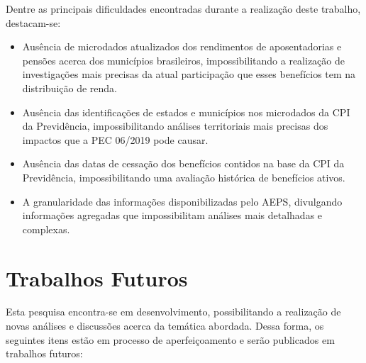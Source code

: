 Dentre as principais dificuldades encontradas durante a realização deste trabalho, destacam-se:

\begin{itemize}
    \item Ausência de microdados atualizados dos rendimentos de aposentadorias e pensões acerca dos municípios brasileiros, impossibilitando a realização de investigações mais precisas da atual participação que esses benefícios tem na distribuição de renda.
    
    \item Ausência das identificações de estados e municípios nos microdados da CPI da Previdência, impossibilitando análises territoriais mais precisas dos impactos que a PEC 06/2019 pode causar.
    
    \item Ausência das datas de cessação dos benefícios contidos na base da CPI da Previdência, impossibilitando uma avaliação histórica de benefícios ativos.
    
    \item A granularidade das informações disponibilizadas pelo AEPS, divulgando informações agregadas que impossibilitam análises mais detalhadas e complexas.
\end{itemize}


\section{Trabalhos Futuros}
 
Esta pesquisa encontra-se em desenvolvimento, possibilitando a realização de novas análises e discussões acerca da temática abordada. Dessa forma, os seguintes itens estão em processo de aperfeiçoamento e serão publicados em trabalhos futuros:


